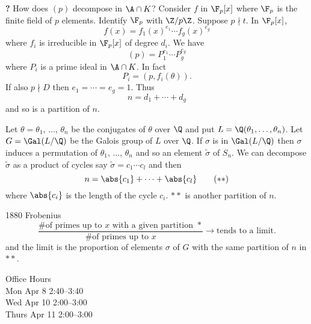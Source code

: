 \textbf{?} How does $(p)$ decompose in $\A\cap K$?  Consider $f$ in $\F_p[x]$ where $\F_p$ is the finite field of $p$ elements.  Identify $\F_p$ with $\Z/p\Z$.  Suppose $p\nmid t$.  In $\F_p[x]$,
\[ f(x) = f_1(x)^{e_1}\dotsm f_g(x)^{e_g} \]
where $f_i$ is irreducible in $\F_p[x]$ of degree $d_i$.  We have
\[ (p) = P_1^{e_1} \dotsm P_g^{e_g} \]
where $P_i$ is a prime ideal in $\A\cap K$.  In fact
\[ P_i = (p,f_i(\theta)) . \]
If also $p\nmid D$ then $e_1=\dotsb=e_g=1$.  Thus
\[ n = d_1 + \dotsb + d_g \tag{$*$} \]
and so is a partition of $n$.

Let $\theta=\theta_1$, $\dotsc$, $\theta_n$ be the conjugates of $\theta$ over $\Q$ and put $L=\Q(\theta_1,\dotsc,\theta_n)$.  Let $G=\Gal(L/\Q)$ be the Galois group of $L$ over $\Q$.  If $\sigma$ is in $\Gal(L/\Q)$ then $\sigma$ induces a permutation of $\theta_1$, $\dotsc$, $\theta_n$ and so an element $\tilde\sigma$ of $S_n$.  We can decompose $\tilde\sigma$ as a product of cycles say $\tilde\sigma=c_1\dotsm c_l$ and then
\[ n = \abs{c_1} + \dotsb + \abs{c_l} \tag{$**$} \]
where $\abs{c_i}$ is the length of the cycle $c_i$.  $**$ is another partition of $n$.

1880 Frobenius
\[ \frac{\text{\# of primes up to $x$ with a given partition $*$}}{\text{\# of primes up to $x$}} \to \text{tends to a limit} . \]
and the limit is the proportion of elements $\sigma$ of $G$ with the same partition of $n$ in $**$.

Office Hours \\
Mon Apr 8 2:40--3:40 \\
Wed Apr 10 2:00--3:00 \\
Thurs Apr 11 2:00--3:00

